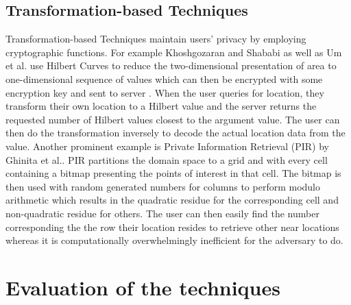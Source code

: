 \documentclass[english]{tktltiki2}
\theoremstyle{definition}
\theoremstyle{remark}
\begin{document}
\subsection{Transformation-based Techniques}

Transformation-based Techniques maintain users' privacy by employing cryptographic functions. For example Khoshgozaran and Shababi as well as Um et al. use Hilbert Curves to reduce the two-dimensional presentation of area to one-dimensional sequence of values which can then be encrypted with some encryption key and sent to server \cite{Hilbert, Um2010}. When the user queries for location, they transform their own location to a Hilbert value and the server returns the requested number of Hilbert values closest to the argument value. The user can then do the transformation inversely to decode the actual location data from the value. Another prominent example is Private Information Retrieval (PIR) by Ghinita et al.\cite{Ghinita2008}. PIR partitions the domain space to a grid and with every cell containing a bitmap presenting the points of interest in that cell. The bitmap is then used with random generated numbers for columns to perform modulo arithmetic which results in the quadratic residue for the corresponding cell and non-quadratic residue for others. The user can then easily find the number corresponding the the row their location resides to retrieve other near locations whereas it is computationally overwhelmingly inefficient for the adversary to do.	

\section{Evaluation of the techniques}
\end{document}
